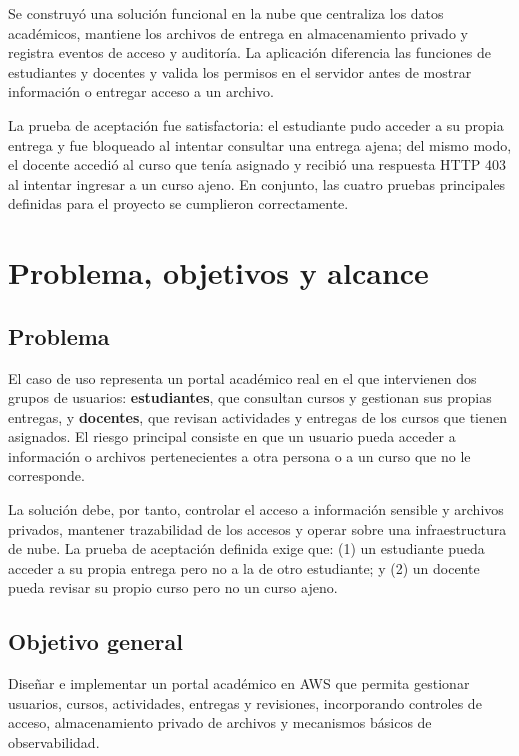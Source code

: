 \documentclass[11pt,letterpaper]{article}
\begin{document}
Se construyó una solución funcional en la nube que centraliza los datos académicos, mantiene los archivos de entrega en almacenamiento privado y registra eventos de acceso y auditoría. La aplicación diferencia las funciones de estudiantes y docentes y valida los permisos en el servidor antes de mostrar información o entregar acceso a un archivo.

La prueba de aceptación fue satisfactoria: el estudiante pudo acceder a su propia entrega y fue bloqueado al intentar consultar una entrega ajena; del mismo modo, el docente accedió al curso que tenía asignado y recibió una respuesta HTTP 403 al intentar ingresar a un curso ajeno. En conjunto, las cuatro pruebas principales definidas para el proyecto se cumplieron correctamente.

\section{Problema, objetivos y alcance}

\subsection{Problema}

El caso de uso representa un portal académico real en el que intervienen dos grupos de usuarios: \textbf{estudiantes}, que consultan cursos y gestionan sus propias entregas, y \textbf{docentes}, que revisan actividades y entregas de los cursos que tienen asignados. El riesgo principal consiste en que un usuario pueda acceder a información o archivos pertenecientes a otra persona o a un curso que no le corresponde.

La solución debe, por tanto, controlar el acceso a información sensible y archivos privados, mantener trazabilidad de los accesos y operar sobre una infraestructura de nube. La prueba de aceptación definida exige que: (1) un estudiante pueda acceder a su propia entrega pero no a la de otro estudiante; y (2) un docente pueda revisar su propio curso pero no un curso ajeno.

\subsection{Objetivo general}

Diseñar e implementar un portal académico en AWS que permita gestionar usuarios, cursos, actividades, entregas y revisiones, incorporando controles de acceso, almacenamiento privado de archivos y mecanismos básicos de observabilidad.
\end{document}
